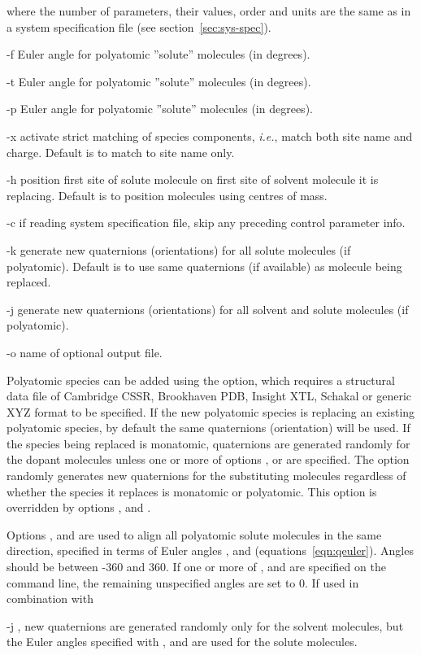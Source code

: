 \documentclass[a4paper,twoside]{report}
\newcommand{\ie}{\emph{i.e.}}
\begin{document}
\begin{Argdescription}
\begin{displaymath}
\end{displaymath}
where the number of parameters, their values, order and units are the
same as in a system specification file (see section~\ref{sec:sys-spec}).
\item[-f] Euler angle \phi for polyatomic ''solute'' molecules (in degrees).
\item[-t] Euler angle \theta for polyatomic ''solute'' molecules (in degrees).
\item[-p] Euler angle \psi for polyatomic ''solute'' molecules (in degrees).
\item[-x] activate strict matching of species components, \ie, match both site name and charge.
  Default is to match to site name only.
\item[-h] position first site of solute molecule on first site of solvent molecule it is replacing.
  Default is to position molecules using centres of mass.
\item[-c] if reading system specification file, skip any preceding
  control parameter info.
\item[-k] generate new quaternions (orientations) for all solute molecules (if polyatomic). Default is to use same quaternions (if available)
as molecule being replaced.
\item[-j] generate new quaternions (orientations) for all solvent and solute molecules (if polyatomic).
\item[-o] name of optional output file.
\end{Argdescription}

Polyatomic species can be added using the  option, which requires a structural data file
of Cambridge CSSR, Brookhaven PDB, Insight XTL, Schakal or generic XYZ format to be specified. If the new polyatomic
species is replacing an existing polyatomic species, by default the same quaternions (orientation) will be used.
 If the species being replaced is monatomic, quaternions are generated randomly for the dopant molecules unless one or more of
 options ,  or  are specified. The  option randomly generates
new quaternions for the substituting molecules regardless of whether the species it replaces is
monatomic or polyatomic. This option is overridden by options ,  and .

Options ,  and  are used to align all polyatomic solute molecules in the same direction, 
specified in terms of Euler angles \phi, \theta and \psi (equations~\ref{eqn:qeuler}). Angles should be between -360 and 360{\textdegree}.
If one or more of ,  and  are specified on the command 
line, the remaining unspecified angles are set to 0.
If used in combination with \item[-j], new quaternions are generated randomly only for the solvent molecules, but the 
Euler angles specified with ,  and  are used for the solute molecules.
\end{document}
